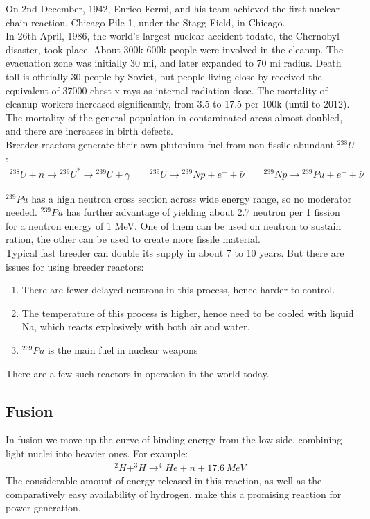 \documentclass[11pt]{article}
\theoremstyle{break}
\theoremstyle{break}
\begin{document}
On 2nd December, 1942, Enrico Fermi, and his team achieved the first nuclear chain reaction, Chicago Pile-1, under the Stagg Field, in Chicago.\\


In 26th April, 1986, the world's largest nuclear accident todate, the Chernobyl disaster, took place. About 300k-600k people were involved in the cleanup. The evacuation zone was initially 30 mi, and later expanded to 70 mi radius. Death toll is officially 30 people by Soviet, but people living close by received the equivalent of 37000 chest x-rays as internal radiation dose. The mortality of cleanup workers increased significantly, from 3.5 to 17.5 per 100k (until to 2012). The mortality of the general population in contaminated areas almost doubled, and there are increases in birth defects.\\



Breeder reactors generate their own plutonium fuel from non-fissile abundant $^{238}U$:
\begin{align*}
^{238}U + n \to {}^{239}U^* \to {}^{239}U +\gamma \qquad {}^{239}U\to{}^{239}Np +e^- +\bar{\nu}\qquad {}^{239}Np \to {}^{239}Pu + e^- + \bar{\nu}
\end{align*}

$^{239}Pu$ has a high neutron cross section across wide energy range, so no moderator needed.
$^{239}Pu$ has further advantage of yielding about 2.7 neutron per 1 fission for a neutron energy of 1 MeV. One of them can be used on neutron to sustain ration, the other can be used to create more fissile material.\\

Typical fast breeder can double its supply in about 7 to 10 years. But there are issues for using breeder reactors:
\begin{enumerate}[topsep=3pt,itemsep=-1ex,partopsep=1ex,parsep=1ex]
\item There are fewer delayed neutrons in this process, hence harder to control.
\item The temperature of this process is higher, hence need to be cooled with liquid Na, which reacts explosively with both air and water.
\item $^{239}Pu$ is the main fuel in nuclear weapons
\end{enumerate}
There are a few such reactors in operation in the world today.\\

\subsection{Fusion}
In fusion we move up the curve of binding energy from the low side, combining light nuclei into heavier ones. For example:
\begin{align*}
^2 H + ^3 H \to ^4He + n + 17.6\, MeV
\end{align*}
The considerable amount of energy released in this reaction, as well as the comparatively easy availability of hydrogen, make this a promising reaction for power generation. \\
\end{document}
